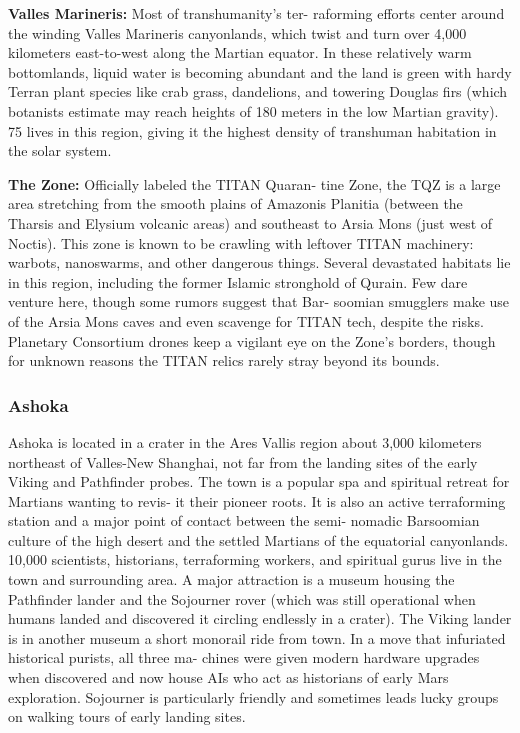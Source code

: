 \textbf{Valles Marineris:} Most of transhumanity's ter-
raforming efforts center around the winding Valles 
Marineris canyonlands, which twist and turn over 
4,000 kilometers east-to-west along the Martian 
equator. In these relatively warm bottomlands, liquid 
water is becoming abundant and the land is green with 
hardy Terran plant species like crab grass, dandelions, 
and towering Douglas firs (which botanists estimate 
may reach heights of 180 meters in the low Martian 
gravity). 75%
lives in this region, giving it the highest density of 
transhuman habitation in the solar system.

\textbf{The Zone:} Officially labeled the TITAN Quaran-
tine Zone, the TQZ is a large area stretching from 
the smooth plains of Amazonis Planitia (between the 
Tharsis and Elysium volcanic areas) and southeast to 
Arsia Mons (just west of Noctis). This zone is known 
to be crawling with leftover TITAN machinery: 
warbots, nanoswarms, and other dangerous things. 
Several devastated habitats lie in this region, including 
the former Islamic stronghold of Qurain. Few dare 
venture here, though some rumors suggest that Bar-
soomian smugglers make use of the Arsia Mons caves 
and even scavenge for TITAN tech, despite the risks. 
Planetary Consortium drones keep a vigilant eye on 
the Zone's borders, though for unknown reasons the 
TITAN relics rarely stray beyond its bounds.

\subsubsection{Ashoka}

Ashoka is located in a crater in the Ares Vallis region 
about 3,000 kilometers northeast of Valles-New 
Shanghai, not far from the landing sites of the early 
Viking and Pathfinder probes. The town is a popular 
spa and spiritual retreat for Martians wanting to revis-
it their pioneer roots. It is also an active terraforming 
station and a major point of contact between the semi-
nomadic Barsoomian culture of the high desert and 
the settled Martians of the equatorial canyonlands. 
10,000 scientists, historians, terraforming workers, 
and spiritual gurus live in the town and surrounding 
area. A major attraction is a museum housing the 
Pathfinder lander and the Sojourner rover (which was 
still operational when humans landed and discovered 
it circling endlessly in a crater). The Viking lander is in 
another museum a short monorail ride from town. In 
a move that infuriated historical purists, all three ma-
chines were given modern hardware upgrades when 
discovered and now house AIs who act as historians 
of early Mars exploration. Sojourner is particularly 
friendly and sometimes leads lucky groups on walking 
tours of early landing sites.

